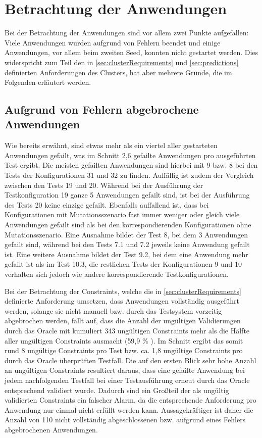 \section{Betrachtung der Anwendungen}
\label{sec:appEval}

Bei der Betrachtung der Anwendungen sind vor allem zwei Punkte aufgefallen:
Viele Anwendungen wurden aufgrund von Fehlern beendet und einige Anwendungen, vor allem beim zweiten Seed, konnten nicht gestartet werden.
Dies widerspricht zum Teil den in \autoref{sec:clusterRequirements} und \autoref{sec:predictions} definierten Anforderungen des Clusters, hat aber mehrere Gründe, die im Folgenden erläutert werden.

\subsection{Aufgrund von Fehlern abgebrochene Anwendungen}
\label{sec:failedApps}

Wie bereits erwähnt, sind etwas mehr als ein viertel aller gestarteten Anwendungen gefailt, was im Schnitt 2,6 gefailte Anwendungen pro ausgeführten Test ergibt.
Die meisten gefailten Anwendungen sind hierbei mit 9 bzw. 8 bei den Tests der Konfigurationen 31 und 32 zu finden.
Auffällig ist zudem der Vergleich zwischen den Tests 19 und 20.
Während bei der Ausführung der Testkonfiguration 19 ganze 5 Anwendungen gefailt sind, ist bei der Ausführung des Tests 20 keine einzige gefailt.
Ebenfalls auffallend ist, dass bei Konfigurationen mit Mutationsszenario fast immer weniger oder gleich viele Anwendungen gefailt sind als bei den korrespondierenden Konfigurationen ohne Mutationsszenario.
Eine Ausnahme bildet der Test 8, bei dem 3 Anwendungen gefailt sind, während bei den Tests 7.1 und 7.2 jeweils keine Anwendung gefailt ist.
Eine weitere Ausnahme bildet der Test 9.2, bei dem eine Anwendung mehr gefailt ist als im Test 10.3, die restlichen Tests der Konfigurationen 9 und 10 verhalten sich jedoch wie andere korrespondierende Testkonfigurationen.

Bei der Betrachtung der Constraints, welche die in \autoref{sec:clusterRequirements} definierte Anforderung umsetzen, dass Anwendungen vollständig ausgeführt werden, solange sie nicht manuell bzw. durch das Testsystem vorzeitig abgebrochen werden, fällt auf, dass die Anzahl der ungültigen Validierungen durch das Oracle mit kumuliert 343 ungültigen Constraints mehr als die Hälfte aller ungültigen Constraints ausmacht (59,9 \% ).
Im Schnitt ergibt das somit rund 8 ungültige Constraints pro Test bzw. ca. 1,8 ungültige Constraints pro durch das Oracle überprüften Testfall.
Die auf den ersten Blick sehr hohe Anzahl an ungültigen Constraints resultiert daraus, dass eine gefailte Anwendung bei jedem nachfolgenden Testfall bei einer Testausführung erneut durch das Oracle entsprechend validiert wurde.
Dadurch sind ein Großteil der als ungültig validierten Constraints ein falscher Alarm, da die entsprechende Anforderung pro Anwendung nur einmal nicht erfüllt werden kann.
Aussagekräftiger ist daher die Anzahl von 110 nicht vollständig abgeschlossenen bzw. aufgrund eines Fehlers abgebrochenen Anwendungen.

